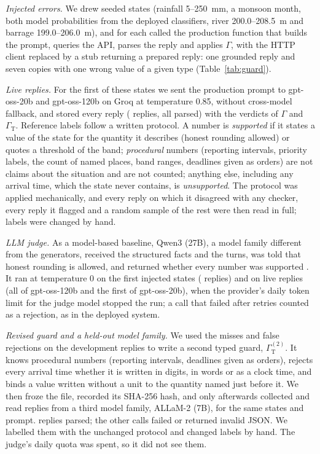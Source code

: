 \documentclass[conference]{IEEEtran}
\begin{document}
\textit{Injected errors.} We drew \GuardCtx{} seeded states (rainfall 5--250~mm, a monsoon month, both model probabilities from the deployed classifiers, river 200.0--208.5~m and barrage 199.0--206.0~m), and for each called the production function that builds the prompt, queries the API, parses the reply and applies $\Gamma$, with the HTTP client replaced by a stub returning a prepared reply: one grounded reply and seven copies with one wrong value of a given type (Table~\ref{tab:guard}).

\textit{Live replies.} For the first \LiveStates{} of these states we sent the production prompt to gpt-oss-20b and gpt-oss-120b on Groq at temperature 0.85, without cross-model fallback, and stored every reply (\LiveN{} replies, all parsed) with the verdicts of $\Gamma$ and $\Gamma_{\mathrm{T}}$. Reference labels follow a written protocol. A number is \emph{supported} if it states a value of the state for the quantity it describes (honest rounding allowed) or quotes a threshold of the band; \emph{procedural} numbers (reporting intervals, priority labels, the count of named places, band ranges, deadlines given as orders) are not claims about the situation and are not counted; anything else, including any arrival time, which the state never contains, is \emph{unsupported}. The protocol was applied mechanically, and every reply on which it disagreed with any checker, every reply it flagged and a random sample of the rest were then read in full; \LiveOverrides{} labels were changed by hand.

\textit{LLM judge.} As a model-based baseline, Qwen3 (27B), a model family different from the generators, received the structured facts and the turns, was told that honest rounding is allowed, and returned whether every number was supported \cite{Zheng2023}. It ran at temperature 0 on the first \JudgeInjStates{} injected states (\JudgeInjItems{} replies) and on \LiveJudN{} live replies (all \LiveJudNOneTwenty{} of gpt-oss-120b and the first \LiveJudNTwenty{} of gpt-oss-20b), when the provider's daily token limit for the judge model stopped the run; a call that failed after retries counted as a rejection, as in the deployed system.

\textit{Revised guard and a held-out model family.} We used the misses and false rejections on the \LiveN{} development replies to write a second typed guard, $\Gamma_{\mathrm{T}}^{(2)}$. It knows procedural numbers (reporting intervals, deadlines given as orders), rejects every arrival time whether it is written in digits, in words or as a clock time, and binds a value written without a unit to the quantity named just before it. We then froze the file, recorded its SHA-256 hash, and only afterwards collected and read replies from a third model family, ALLaM-2 (7B), for the same \HoStates{} states and prompt. \HoN{} replies parsed; the other \HoParseFail{} calls failed or returned invalid JSON. We labelled them with the unchanged protocol and changed \HoOverrides{} labels by hand. The judge's daily quota was spent, so it did not see them.
\end{document}
